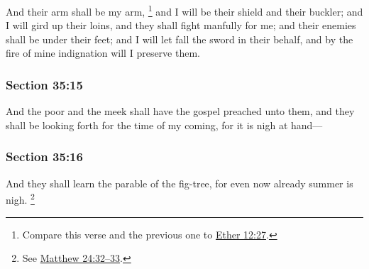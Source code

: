 		And their arm shall be my arm,%
			\footnote{%
				Compare this verse and the previous one to \hyperref[ETHER-12-27]{Ether 12:27}.
				}
		and I will be their shield and their buckler; and I will gird up their loins, and they shall fight manfully for me; and their enemies shall be under their feet; and I will let fall the sword in their behalf, and by the fire of mine indignation will I preserve them.


	\subsubsection{Section 35:15} %
		\label{DC35-15}

		And the poor and the meek shall have the gospel preached unto them, and they shall be looking forth for the time of my coming, for it is nigh at hand---


	\subsubsection{Section 35:16} %
		\label{DC35-16}

		And they shall learn the parable of the fig-tree, for even now already summer is nigh.%
		\footnote{%
			See \hyperref[MATTHEW-24-32]{Matthew 24:32--33}.
			} 


